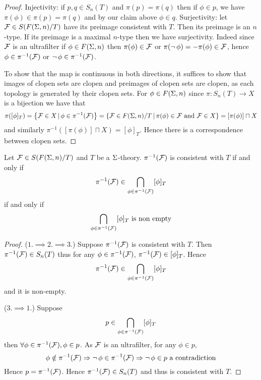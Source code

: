 \begin{proof}
    Injectivity: if $p,q \in S_n(T)$ and $\pi(p) = \pi(q)$ then 
    if $\phi \in p$, we have $\pi(\phi) \in \pi(p) = \pi(q)$ and by our 
    claim above $\phi \in q$.
    Surjectivity: let $\mathcal{F} \in S(F(\Sigma,n) / T)$ 
    have its preimage consistent with $T$.
    Then its preimage is an $n$-type.
    If its preimage is a maximal $n$-type then we have surjectivity.
    Indeed since $\mathcal{F}$ is an ultrafilter if $\phi \in F(\Sigma,n)$ then 
    $\pi(\phi) \in \mathcal{F}$ or $\pi(\neg\, \phi) = - \pi(\phi) \in \mathcal{F}$,
    hence $\phi \in \pi^{-1}(\mathcal{F})$ or $\neg\, \phi \in \pi^{-1}(\mathcal{F})$.

    To show that the map is continuous in both directions,
    it suffices to show that images of clopen sets are clopen and preimages of 
    clopen sets are clopen,
    as each topology is generated by their clopen sets.
    For $\phi \in F(\Sigma,n)$ since 
    $\pi : S_n(T) \to X$ is a bijection we have that
    \[\pi([\phi]_T) = \left\{\mathcal{F} \in X \,|\, \phi \in \pi^{-1}(\mathcal{F})\right\} =
    \left\{\mathcal{F} \in F(\Sigma,n) / T \,|\, \pi(\phi) \in \mathcal{F} \text{ and } \mathcal{F} \in X\right\} = 
    [\pi(\phi)] \sqcap X\]
    and similarly $\pi^{-1}([\pi(\phi)] \sqcap X) = [\phi]_T$.
    Hence there is a correspondence between clopen sets.
\end{proof}

\begin{lem}
    Let $\mathcal{F} \in S(F(\Sigma,n) / T)$ and $T$ be a $\Sigma$-theory.
    $\pi^{-1}(\mathcal{F})$ is consistent with $T$ if and only if 
    \[\pi^{-1}(\mathcal{F}) \in \bigcap_{\phi \in \pi^{-1}(\mathcal{F})} [\phi]_T\]
    if and only if 
    \[\bigcap_{\phi \in \pi^{-1}(\mathcal{F})} [\phi]_T \text{ is non empty}\]
\end{lem}
\begin{proof}
    ($1. \implies 2. \implies 3.$)
        Suppose $\pi^{-1}(\mathcal{F})$ is consistent with $T$.
        Then $\pi^{-1}(\mathcal{F}) \in S_n(T)$ thus for any $\phi \in \pi^{-1}(\mathcal{F})$, 
        $\pi^{-1}(\mathcal{F}) \in [\phi]_T$. 
        Hence 
        \[\pi^{-1}(\mathcal{F}) \in \bigcap_{\phi \in \pi^{-1}(\mathcal{F})} [\phi]_T\]
        and it is non-empty.

    ($3. \implies 1.$)
        Suppose 
        \[p \in \bigcap_{\phi \in \pi^{-1}(\mathcal{F})} [\phi]_T\]
        then $\forall \phi \in \pi^{-1}(\mathcal{F}), \phi \in p$.
        As $\mathcal{F}$ is an ultrafilter, for any $\phi \in p$, 
        \[\phi \notin \pi^{-1}(\mathcal{F}) \Rightarrow \neg\, \phi \in \pi^{-1}(\mathcal{F}) 
        \Rightarrow \neg\, \phi \in p \text{ a contradiction}\]
        Hence $p = \pi^{-1}(\mathcal{F})$.
        Hence $\pi^{-1}(\mathcal{F}) \in S_n(T)$ and thus is consistent with $T$.
\end{proof}

